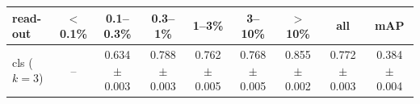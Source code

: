 \begin{tabular}{lcccccccc}
\toprule
read-out & $<$0.1\% & 0.1--0.3\% & 0.3--1\% & 1--3\% & 3--10\% & $>$10\% & all & mAP \\
\midrule
cls ($k=3$) & -- & 0.634 $\pm$ 0.003 & 0.788 $\pm$ 0.003 & 0.762 $\pm$ 0.005 & 0.768 $\pm$ 0.005 & 0.855 $\pm$ 0.002 & 0.772 $\pm$ 0.003 & 0.384 $\pm$ 0.004 \\
\bottomrule
\end{tabular}
